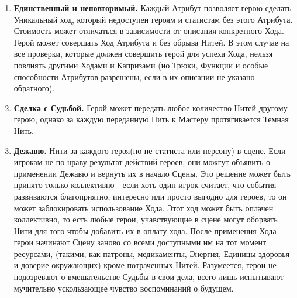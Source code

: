 \begin{enumerate}
\begin{tcolorbox}
\end{tcolorbox}
\item \textbf{Единственный и неповторимый.}
\newline Каждый Атрибут позволяет герою сделать Уникальный ход, который недоступен героям и статистам без этого Атрибута. Стоимость может отличаться в зависимости от описания конкретного Хода.
\newline Герой может совершать Ход Атрибута и без обрыва Нитей. В этом случае на все проверки, которые должен совершить герой для успеха Хода, нельзя повлиять другими Ходами и Капризами (но Трюки, Функции и особые способности Атрибутов разрешены, если в их описании не указано обратного).
\item \textbf{Сделка с Судьбой.} Герой может передать любое количество Нитей другому герою, однако за каждую переданную Нить к Мастеру протягивается Темная Нить.
\item \textbf{Дежавю.}
 Нити за каждого героя(но не статиста или персону) в сцене. Если игрокам не по нраву результат действий героев, они можгут объявить о применении Дежавю и вернуть их в начало Сцены.
\newline Это решение может быть принято только коллективно - если хоть один игрок считает, что события развиваются благоприятно, интересно или просто выгодно для героев, то он может заблокировать использование Хода.
\newline Этот ход может быть оплачен коллективно, то есть любые герои, учавствующие в сцене могут оборвать Нити для того чтобы добавить их в оплату хода.
\newline После применения Хода герои начинают Сцену заново со всеми доступными им на тот момент ресурсами, (такими, как патроны, медикаменты, Энергия, Единицы здоровья и доверие окружающих) кроме потраченных Нитей. Разумеется, герои не подозревают о вмешательстве Судьбы в свои дела, всего лишь испытывают мучительно ускользающее чувство воспоминаний о будущем.
\end{enumerate}
